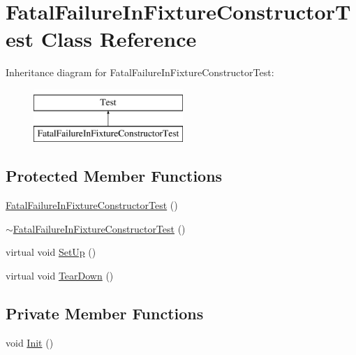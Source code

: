 \hypertarget{classFatalFailureInFixtureConstructorTest}{\section{\-Fatal\-Failure\-In\-Fixture\-Constructor\-Test \-Class \-Reference}
\label{d5/d13/classFatalFailureInFixtureConstructorTest}
}
\-Inheritance diagram for \-Fatal\-Failure\-In\-Fixture\-Constructor\-Test\-:\begin{figure}[H]
\begin{center}
\leavevmode
\includegraphics[height=2.000000cm]{d5/d13/classFatalFailureInFixtureConstructorTest}
\end{center}
\end{figure}
\subsection*{\-Protected \-Member \-Functions}
\begin{DoxyCompactItemize}
\item 
\hyperlink{classFatalFailureInFixtureConstructorTest_ac4dc608b5e9fccd0d0ea75c40684480c}{\-Fatal\-Failure\-In\-Fixture\-Constructor\-Test} ()
\item 
\hyperlink{classFatalFailureInFixtureConstructorTest_a5faa8636f24efc25c517e09661bef10c}{$\sim$\-Fatal\-Failure\-In\-Fixture\-Constructor\-Test} ()
\item 
virtual void \hyperlink{classFatalFailureInFixtureConstructorTest_a901706a587f9ae84df8b2395fbe759cb}{\-Set\-Up} ()
\item 
virtual void \hyperlink{classFatalFailureInFixtureConstructorTest_a870a092058305911f3d42df45dd657e5}{\-Tear\-Down} ()
\end{DoxyCompactItemize}
\subsection*{\-Private \-Member \-Functions}
\begin{DoxyCompactItemize}
\item 
void \hyperlink{classFatalFailureInFixtureConstructorTest_a1e3b6d38df0786ccf7f938d60e386aae}{\-Init} ()
\end{DoxyCompactItemize}


